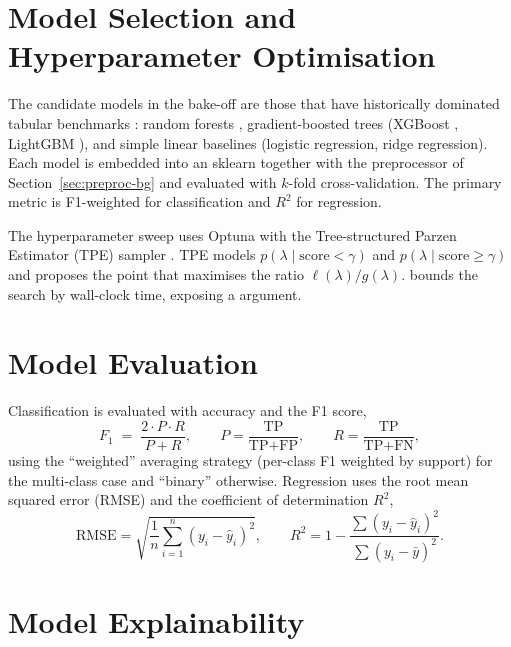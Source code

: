 \section{Model Selection and Hyperparameter Optimisation}
\label{sec:hpo-bg}

The candidate models in the \projname{} bake-off are those that have
historically dominated tabular benchmarks
\citep{grinsztajn2022trees, borisov2022deep}: random forests
\citep{breiman2001rf}, gradient-boosted trees (XGBoost
\citep{chen2016xgboost}, LightGBM \citep{ke2017lightgbm}), and simple
linear baselines (logistic regression, ridge regression). Each model
is embedded into an sklearn  together with the
preprocessor of Section~\ref{sec:preproc-bg} and evaluated with
$k$-fold cross-validation. The primary metric is F1-weighted for
classification and $R^2$ for regression.

The hyperparameter sweep uses Optuna \citep{akiba2019optuna} with the
Tree-structured Parzen Estimator (TPE) sampler
\citep{bergstra2011algorithms}. TPE models
$p(\lambda \mid \text{score} < \gamma)$ and
$p(\lambda \mid \text{score} \ge \gamma)$ and proposes the point that
maximises the ratio $\ell(\lambda) / g(\lambda)$. \projname{} bounds
the search by wall-clock time, exposing a 
argument.

\section{Model Evaluation}
\label{sec:eval-bg}

Classification is evaluated with accuracy and the F1 score,
\begin{equation}
  F_1 \;=\; \frac{2\cdot P \cdot R}{P + R},
  \qquad
  P = \frac{\text{TP}}{\text{TP}+\text{FP}},
  \qquad
  R = \frac{\text{TP}}{\text{TP}+\text{FN}},
  \label{eq:f1}
\end{equation}
using the ``weighted'' averaging strategy (per-class F1 weighted by
support) for the multi-class case and ``binary'' otherwise. Regression
uses the root mean squared error (RMSE) and the coefficient of
determination $R^2$,
\begin{equation}
  \text{RMSE} = \sqrt{\frac{1}{n}\sum_{i=1}^{n}(y_i-\hat{y}_i)^2},
  \qquad
  R^2 = 1 - \frac{\sum(y_i-\hat{y}_i)^2}{\sum(y_i-\bar y)^2}.
  \label{eq:rmse-r2}
\end{equation}

\section{Model Explainability}
\label{sec:xai-bg}

